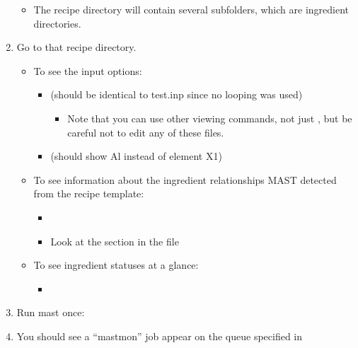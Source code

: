 \documentclass[letterpaper,10pt,english]{sphinxmanual}
\begin{document}
\begin{enumerate}
\begin{itemize}
\item {} 
The recipe directory will contain several subfolders, which are ingredient directories.

\end{itemize}

\item {} 
Go to that recipe directory.
\begin{itemize}
\item {} 
To see the input options:
\begin{itemize}
\item {} 
 (should be identical to test.inp since no looping was used)
\begin{itemize}
\item {} 
Note that you can use other viewing commands, not just , but be careful not to edit any of these files.

\end{itemize}

\item {} 
 (should show Al instead of element X1)

\end{itemize}

\item {} 
To see information about the ingredient relationships MAST detected from the recipe template:
\begin{itemize}
\item {} 

\item {} 
Look at the  section in the  file

\end{itemize}

\item {} 
To see ingredient statuses at a glance:
\begin{itemize}
\item {} 

\end{itemize}

\end{itemize}

\item {} 
Run mast once: 

\item {} 
You should see a ``mastmon'' job appear on the queue specified in 


\end{enumerate}
\end{document}
